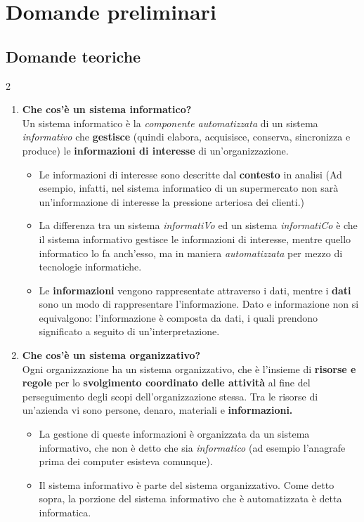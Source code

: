 \documentclass{article}
\newcommand{\sitemize}[1]{%
  \begin{itemize}[label=$\diamond$]
    #1
  \end{itemize}
}
\newcounter{esempio}
\begin{document}
\section{Domande preliminari}
\subsection{Domande teoriche}

\begin{multicols}{2}
	\begin{enumerate}[leftmargin=*, align=left]
		\item \textbf{Che cos'è un sistema informatico?}\\
		Un sistema informatico è la \textit{componente automatizzata} di un sistema \textit{informativo} che \textbf{gestisce} (quindi elabora, acquisisce, conserva, sincronizza e produce) le \textbf{informazioni di interesse} di un'organizzazione. 
		\sitemize{
			\item Le informazioni di interesse sono descritte dal \textbf{contesto} in analisi (Ad esempio, infatti, nel sistema informatico di un supermercato non sarà un'informazione di interesse la pressione arteriosa dei clienti.)
			\item La differenza tra un sistema \textit{informatiVo} ed un sistema \textit{informatiCo} è che il sistema informativo gestisce le informazioni di interesse, mentre quello informatico lo fa anch'esso, ma in maniera \textit{automatizzata} per mezzo di tecnologie informatiche.
			\item Le \textbf{informazioni} vengono rappresentate attraverso i dati, mentre i \textbf{dati} sono un modo di rappresentare l'informazione. Dato e informazione non si equivalgono: l'informazione è composta da
			dati, i quali prendono significato a seguito di un'interpretazione.
		}
		\item \textbf{Che cos'è un sistema organizzativo?}\\
		Ogni organizzazione ha un sistema organizzativo, che è l'insieme di \textbf{risorse e regole} per lo \textbf{svolgimento coordinato delle attività} al fine del perseguimento degli scopi dell'organizzazione stessa. Tra le risorse di un'azienda vi sono persone, denaro, materiali e \textbf{informazioni.} \sitemize{\item La gestione di queste informazioni è organizzata da un sistema informativo, che non è detto che sia \textit{informatico} (ad esempio l'anagrafe prima dei computer esisteva comunque). \item Il sistema informativo è parte del sistema organizzativo. Come detto sopra, la porzione del sistema informativo che è automatizzata è detta informatica.}

\end{enumerate}
\end{multicols}
\end{document}
